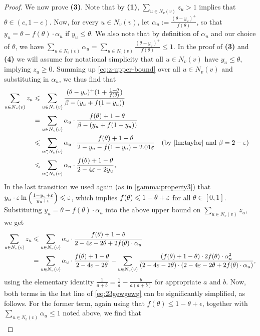 \begin{proof}
	We now prove {\bf (3)}. Note that by \textbf{(1)}, $\sum_{u\in N_v(v)}z_u > 1$ implies that $\theta\in (c, 1-c)$. Now, for every $u\in N_v(v)$, let $\alpha_u:=\frac{(\theta-y_u)^+}{f(\theta)}$, so that $y_u=\theta-f(\theta)\cdot \alpha_u$ if $y_u \leq \theta$.
	We also note that by definition of $\alpha_u$ and our choice of $\theta$, we have $\sum_{u\in N_v(v)} \alpha_u = \sum_{u\in N_v(v)} \frac{(\theta-y_u)^+}{f(\theta)} \leq 1$. 
	In the proof of {\bf(3)} and {\bf(4)} we will assume for notational simplicity that all $u\in N_v(v)$ have $y_u \leq \theta$, implying $z_u\geq 0$. Summing up \eqref{eq:z-upper-bound} over all $u\in N_v(v)$ and substituting in $\alpha_u$, we thus find that
	\begin{align*}
	\sum_{u\in N_v(v)} z_u&\leq \sum_{u\in N_v(v)} \frac{(\theta-y_u)^+(1+\frac{1-\theta}{f(\theta)})}{\beta-(y_u+f(1-y_u))}\\
	&=\sum_{u\in N_v(v)} \alpha_u \cdot  \frac{f(\theta)+1-\theta}{\beta-(y_u+f(1-y_u))}\\
	&\leq \sum_{u\in N_v(v)} \alpha_u \cdot  \frac{f(\theta)+1-\theta}{2-y_u-f(1-y_u)-2.01\e} && \text{(by~\Cref{lm:taylor} and $\beta=2-\eps$)}\\
	& \leq \sum_{u\in N_v(v)} \alpha_u \cdot \frac{f(\theta)+1-\theta}{2- 4\e -2y_u},
	\end{align*}
	In the last transition we used again (as in \cref{gamma:property3}) that $ y_u\cdot \varepsilon \ln \left(\frac{1-y_u+\varepsilon}{y_u+\varepsilon}\right) \leqslant \varepsilon$, which implies $f(\theta) \leqslant 1-\theta + \varepsilon$ for all $\theta\in [0,1]$. Substituting $y_u = \theta-f(\theta)\cdot \alpha_u$ into the above upper bound on $\sum_{u\in N_v(v)} z_u$, we get
	\begin{align}
	\sum_{u\in N_v(v)} z_u&\leqslant \sum_{u\in N_v(v)} \alpha_u \cdot \frac{f(\theta)+1-\theta}{2-4\varepsilon-2\theta+2 f(\theta) \cdot \alpha_u} \nonumber \\
	&=\sum_{u\in N_v(v)} \alpha_u \cdot \frac{f(\theta)+1-\theta}{2-4\varepsilon-2\theta} - \sum_{u\in N_v(v)} \frac{(f(\theta)+1-\theta)\cdot 2f(\theta)\cdot \alpha_u^2}{(2-4\varepsilon-2\theta)\cdot (2-4\varepsilon-2\theta+2f(\theta)\cdot \alpha_u)}, \label{eq:23gewgewg}
	\end{align}
	using the elementary identity $\frac{1}{a+b} = \frac{1}{a} - \frac{b}{a(a+b)}$ for appropriate $a$ and $b$.
	Now, both terms in the last line of \eqref{eq:23gewgewg} can be significantly simplified, as follows. For the former term, again using that $f(\theta)\leq 1-\theta+\epsilon$, together with $\sum_{u\in N_v(v)} \alpha_u \leq 1$ noted above, we find that 
	\begin{align} \label{first-term-23gewgewg}

\end{align}
\end{proof}
